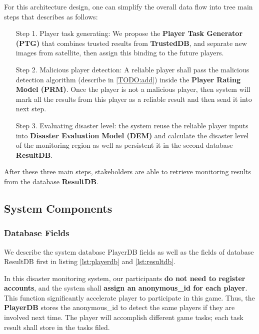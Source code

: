 For this architecture design, one can simplify the overall data flow into tree main steps 
that describes as follows:

\begin{itemize}

\item [Step 1.]  Player task generating: 
We propose the \textbf{Player Task Generator (PTG)} 
that combines trusted results from \textbf{TrustedDB}, 
and separate new images from satellite, then assign this binding to the future players.

\item [Step 2.] Malicious player detection: 
A reliable player shall pass the malicious detection algorithm (describe in \ref{TODO:add})
inside the \textbf{Player Rating Model (PRM)}. 
Once the player is not a malicious player, then system will mark all the results from this player
as a reliable result and then send it into next step.

\item [Step 3.] Evaluating disaster level:  the system reuse the reliable player inputs 
into \textbf{Disaster Evaluation Model (DEM)} and calculate the disaster level of the monitoring region
 as well as persistent it in the second database \textbf{ResultDB}.

\end{itemize}

After these three main steps, stakeholders are able to retrieve monitoring results from
the database \textbf{ResultDB}. 

\subsection{System Components}

\subsubsection{Database Fields}

We describe the system database PlayerDB 
fields as well as the fields of database ResultDB first in listing \ref{lst:playerdb}
and \ref{lst:resultdb}.

In this disaster monitoring system, our participants \textbf{do not need to register accounts},
and the system shall \textbf{assign an anonymous\_id for each player}. 
This function significantly accelerate player to participate in this game. 
Thus, the \textbf{PlayerDB} stores the anonymous\_id to detect the same players if they are involved next time. 
The player will accomplish different game tasks; each task result shall store in the tasks filed.

